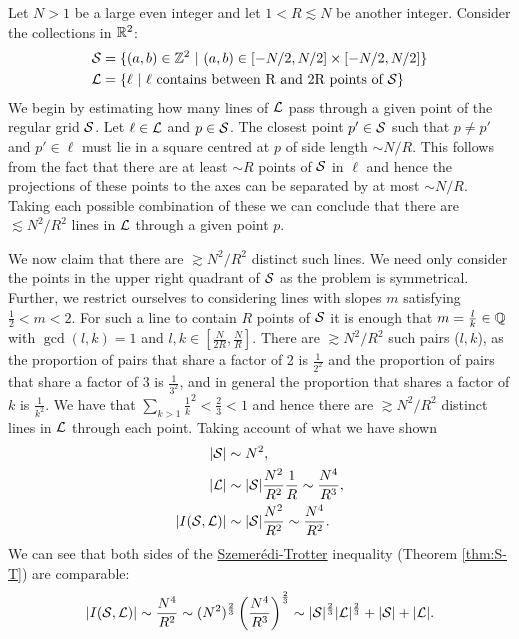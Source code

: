 \begin{example}
    Let $N>1$ be a large even integer and let $1<R \lesssim N$ be another integer. Consider the collections in $\mathbb R^2$:
    \begin{align*}
        \mathcal S &= \{ (a,b) \in \mathbb Z^2 \ | \ (a,b) \in [-N/2,N/2] \times [-N/2,N/2] \} \\
        \mathcal L &= \{ \ell \ | \ \ell \text{ contains between R and 2R points of } \mathcal S \} \end{align*}
    We begin by estimating how many lines of $\mathcal L$ pass through a given point of the regular grid $\mathcal S$.
    Let $\ell \in \mathcal L$ and $p \in \mathcal S$. The closest point $p' \in \mathcal S$ such that $p \neq p'$ and $p' \in \ell$ must lie
    in a square centred at $p$ of side length $\sim N/R$. This follows from the fact that there are at least $\sim R$ points of $\mathcal S$ in $\ell$ and hence the
    projections of these points to the axes can be separated by at most $\sim N/R$. Taking each possible combination of these we can conclude that there are $\lesssim N^2 / R^2$ lines in $\mathcal L$ through a
    given point $p$.

    We now claim that there are $\gtrsim N^2 / R^2$ distinct such lines. We need only consider the points in the upper right quadrant of $\mathcal S$ as the problem is symmetrical.
    Further, we restrict ourselves to considering lines with slopes $m$ satisfying $\frac{1}{2} < m < 2$. For such a line to contain $R$  points
    of $\mathcal S$ it is enough that $m= \frac{l}{k} \in \mathbb Q$ with $\gcd(l,k) =1$ and $l,k \in \left[\frac{N}{2R}, \frac{N}{R} \right]$. There are $\gtrsim N^2/R^2$ such pairs ($l,k$), as the proportion of pairs that share a factor of 2 is $\frac{1}{2^2}$ and the proportion of pairs that share a factor 
    of 3 is $\frac{1}{3^2}$, and in general the proportion that shares a factor of $k$ is $\frac{1}{k^2}$. We have that $\sum_{k>1} \frac{1}{k}^2 < \frac{2}{3} < 1$ and hence there are $\gtrsim N^2 /R^2$ distinct
    lines in $\mathcal L$ through each point. Taking account of what we have shown
    \begin{align*}
        |\mathcal S| &\sim N^2, \\ 
        |\mathcal L| &\sim |\mathcal S| \frac{N^2}{R^2} \frac{1}{R} \sim \frac{N^4}{R^3},\\
        |I(\mathcal S, \mathcal L)| &\sim |\mathcal S| \frac{N^2}{R^2} \sim \frac{N^4}{R^2}.\\
    \end{align*}
    We can see that both sides of the \hyperref[thm:S-T]{Szemerédi-Trotter} inequality (Theorem \ref{thm:S-T}) are comparable:
    \[
    |I(\mathcal S, \mathcal L)| \sim \frac{N^4}{R^2} \sim (N^2)^{\frac{2}{3}} \left(\frac{N^4}{R^3}\right)^{\frac{2}{3}} \sim |\mathcal S|^{\frac{2}{3}}|\mathcal L|^{\frac{2}{3}} + |\mathcal S| + |\mathcal L|.
    \]
\end{example}




